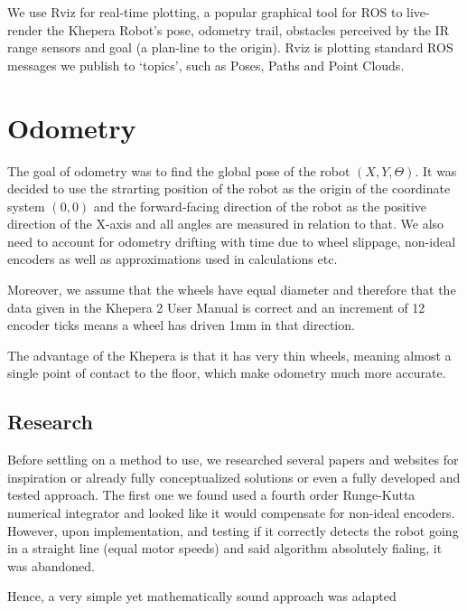 \documentclass[11pt, a4paper]{article}
\begin{document}
We use Rviz for real-time plotting, a popular graphical tool for ROS to live-render the Khepera 
Robot's pose, odometry trail, obstacles perceived by the IR range sensors and goal (a plan-line 
to the origin). Rviz is plotting standard ROS messages we publish to `topics', such as Poses,
Paths and Point Clouds.




\section{Odometry}
\label{Odometry}


The goal of odometry was to find the global pose of the robot ${(X,Y,\Theta)}$. It was decided
to use the strarting position of the robot as the origin of the coordinate system ${(0, 0)}$ 
and the forward-facing direction of the robot as the positive direction of the X-axis and
all angles are measured in relation to that. We also need to account for odometry drifting with
time due to wheel slippage, non-ideal encoders as well as approximations used in calculations etc.

Moreover, we assume that the wheels have equal diameter and therefore that the data given in the 
Khepera 2 User Manual \cite{khepera_manual} is correct and an increment of 12 encoder ticks 
means a wheel has driven 1mm in that direction. 

The advantage of the Khepera is that it has very thin wheels, meaning almost a single point of contact
to the floor, which make odometry much more accurate.

\subsection{Research}

Before settling on a method to use, we researched several papers and websites for inspiration or 
already fully conceptualized solutions or even a fully developed and tested approach. The first one
we found used a fourth order Runge-Kutta numerical integrator \cite{runge_kutta} and looked like 
it would compensate for non-ideal encoders. However, upon implementation, and  testing if it correctly 
detects the robot going in a straight line (equal motor speeds) and said algorithm absolutely fialing,
it was abandoned. 

Hence, a very simple yet mathematically sound approach \cite{odo_used} was adapted 
\end{document}
